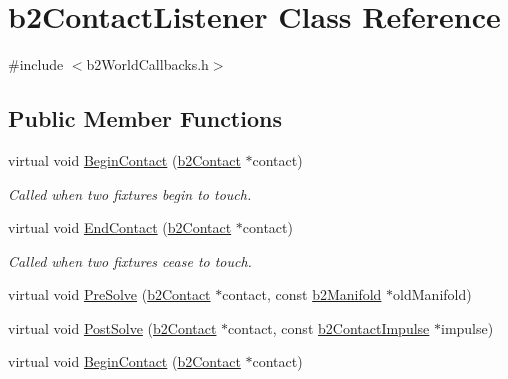 \hypertarget{classb2ContactListener}{}\section{b2\+Contact\+Listener Class Reference}
\label{classb2ContactListener}


{\ttfamily \#include $<$b2\+World\+Callbacks.\+h$>$}

\subsection*{Public Member Functions}
\begin{DoxyCompactItemize}
\item 
\mbox{\label{classb2ContactListener_a35148fc56fb9eac12077200fbd928f65}} 
virtual void \hyperlink{classb2ContactListener_a35148fc56fb9eac12077200fbd928f65}{Begin\+Contact} (\hyperlink{classb2Contact}{b2\+Contact} $\ast$contact)
\begin{DoxyCompactList}\small\item\em Called when two fixtures begin to touch. \end{DoxyCompactList}\item 
\mbox{\label{classb2ContactListener_afb3059058e5c47903a3947c2eef5826b}} 
virtual void \hyperlink{classb2ContactListener_afb3059058e5c47903a3947c2eef5826b}{End\+Contact} (\hyperlink{classb2Contact}{b2\+Contact} $\ast$contact)
\begin{DoxyCompactList}\small\item\em Called when two fixtures cease to touch. \end{DoxyCompactList}\item 
virtual void \hyperlink{classb2ContactListener_a416f85eb45a1099053402b15a19a7de0}{Pre\+Solve} (\hyperlink{classb2Contact}{b2\+Contact} $\ast$contact, const \hyperlink{structb2Manifold}{b2\+Manifold} $\ast$old\+Manifold)
\item 
virtual void \hyperlink{classb2ContactListener_acd58ec96f7569b95eec65b8ca3f8013d}{Post\+Solve} (\hyperlink{classb2Contact}{b2\+Contact} $\ast$contact, const \hyperlink{structb2ContactImpulse}{b2\+Contact\+Impulse} $\ast$impulse)
\item 
\mbox{\label{classb2ContactListener_a35148fc56fb9eac12077200fbd928f65}} 
virtual void \hyperlink{classb2ContactListener_a35148fc56fb9eac12077200fbd928f65}{Begin\+Contact} (\hyperlink{classb2Contact}{b2\+Contact} $\ast$contact)

\end{DoxyCompactItemize}
